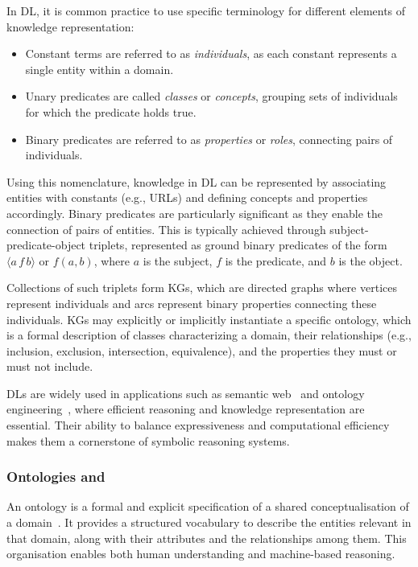 In \gls{DL}, it is common practice to use specific terminology for different elements of knowledge representation:
%
\begin{itemize}
    \item Constant terms are referred to as \textit{individuals}, as each constant represents a single entity within a domain.
    \item Unary predicates are called \textit{classes} or \textit{concepts}, grouping sets of individuals for which the predicate holds true.
    \item Binary predicates are referred to as \textit{properties} or \textit{roles}, connecting pairs of individuals.
\end{itemize}
%

Using this nomenclature, knowledge in \gls{DL} can be represented by associating entities with constants (e.g., URLs) and defining concepts and properties accordingly.
%
Binary predicates are particularly significant as they enable the connection of pairs of entities.
%
This is typically achieved through subject-predicate-object triplets, represented as ground binary predicates of the form \(\langle a \, f \, b\rangle\) or \(f(a, b)\), where \(a\) is the subject, \(f\) is the predicate, and \(b\) is the object.

Collections of such triplets form \glspl{KG}, which are directed graphs where vertices represent individuals and arcs represent binary properties connecting these individuals.
%
\glspl{KG} may explicitly or implicitly instantiate a specific ontology, which is a formal description of classes characterizing a domain, their relationships (e.g., inclusion, exclusion, intersection, equivalence), and the properties they must or must not include.


\glspl{DL} are widely used in applications such as semantic web~\cite{DBLP:conf/coopis/GangemiM03} and ontology engineering~\cite{DBLP:books/ios/HGJKP2016}, where efficient reasoning and knowledge representation are essential.
%
Their ability to balance expressiveness and computational efficiency makes them a cornerstone of symbolic reasoning systems.


\subsubsection[Ontologies and knowledge graph]{Ontologies and }\label{subsubsec:ontologies-and-kg}
%
An ontology is a formal and explicit specification of a shared conceptualisation of a domain~\cite{DBLP:books/daglib/p/Grimm10}.
%
It provides a structured vocabulary to describe the entities relevant in that domain, along with their attributes and the relationships among them.
%
This organisation enables both human understanding and machine-based reasoning.

